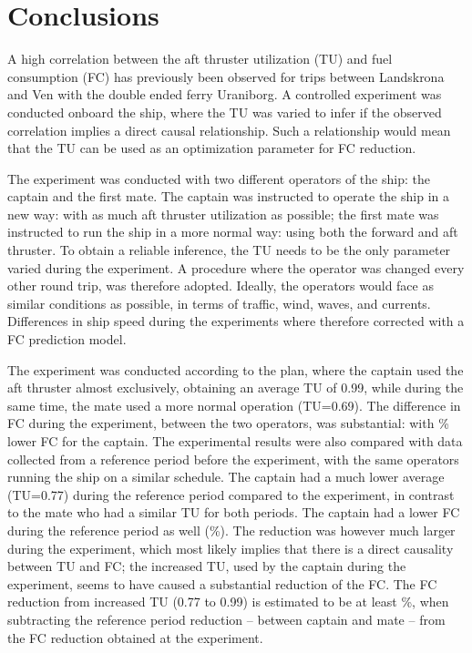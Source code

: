 \section{Conclusions}
A high correlation between the aft thruster utilization (TU) and fuel consumption (FC) has previously been observed for trips between Landskrona and Ven with the double ended ferry Uraniborg.  A controlled experiment was conducted onboard the ship, where the TU was varied to infer if the observed correlation implies a direct causal relationship. Such a relationship would mean that the TU can be used as an optimization parameter for FC reduction.

The experiment was conducted with two different operators of the ship: the captain and the first mate. The captain was instructed to operate the ship in a new way: with as much aft thruster utilization as possible; the first mate was instructed to run the ship in a more normal way: using both the forward and aft thruster.
To obtain a reliable inference, the TU needs to be the only parameter varied during the experiment. A procedure where the operator was changed every other round trip, was therefore adopted. Ideally, the operators would face as similar conditions as possible, in terms of traffic, wind, waves, and currents.
Differences in ship speed during the experiments where therefore corrected with a FC prediction model.

The experiment was conducted according to the plan, where the captain used the aft thruster almost exclusively, obtaining an average TU of 0.99, while during the same time, the mate used a more normal operation (TU=0.69). The difference in FC during the experiment, between the two operators, was substantial: with \savingpctexperiment \% lower FC for the captain.
The experimental results were also compared with data collected from a reference period before the experiment, with the same operators running the ship on a similar schedule. The captain had a much lower average (TU=0.77) during the reference period compared to the experiment, in contrast to the mate who had a similar TU for both periods. The captain had a lower FC during the reference period as well (\savingpctbeforeexperiment \%).
The reduction was however much larger during the experiment, which most likely implies that there is a direct causality between TU and FC; the increased TU, used by the captain during the experiment, seems to have caused a substantial reduction of the FC. The FC reduction from increased TU (0.77 to 0.99) is estimated to be at least \savingthrusterallocationpct \%, when subtracting the reference period reduction -- between captain and mate -- from the FC reduction obtained at the experiment.

